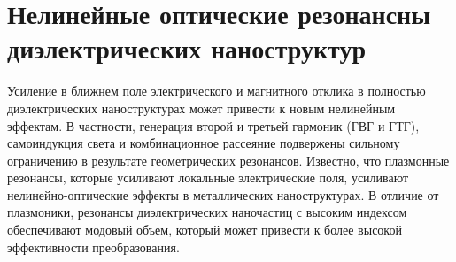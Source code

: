 \section{Нелинейные оптические  резонансны диэлектрических наноструктур}
\hspace*{2mm}
Усиление в ближнем поле электрического и магнитного отклика в полностью диэлектрических наноструктурах может привести к новым нелинейным эффектам. В частности, генерация второй и третьей гармоник (ГВГ и ГТГ), самоиндукция света и комбинационное рассеяние подвержены сильному ограничению в результате геометрических резонансов. Известно, что плазмонные резонансы, которые усиливают локальные электрические поля, усиливают нелинейно-оптические эффекты в металлических наноструктурах. В отличие от плазмоники, резонансы диэлектрических наночастиц с высоким индексом обеспечивают модовый объем, который может привести к более высокой эффективности преобразования.

